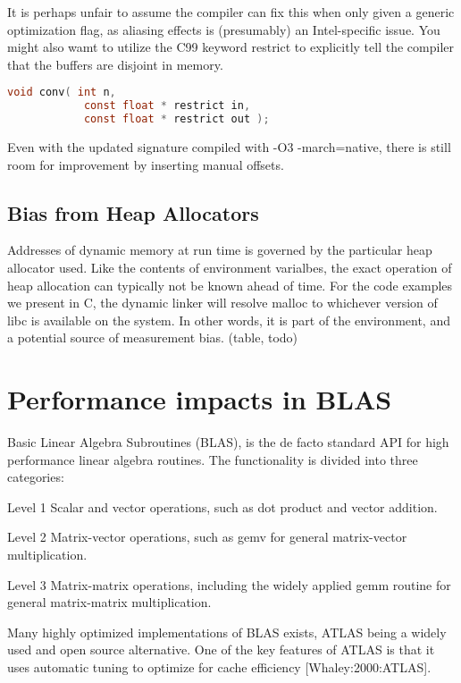 \documentclass[a4paper,10pt,twocolumn,twoside]{article}
\begin{document}
It is perhaps unfair to assume the compiler can fix this when only given a generic optimization flag, as aliasing effects is (presumably) an Intel-specific issue.
You might also wamt to utilize the C99 keyword restrict to explicitly tell the compiler that the buffers are disjoint in memory.

\begin{lstlisting}[language=C]
void conv( int n,
            const float * restrict in,
            const float * restrict out );
\end{lstlisting}

Even with the updated signature compiled with -O3 -march=native, there is still room for improvement by inserting manual offsets.


\subsection{Bias from Heap Allocators}
Addresses of dynamic memory at run time is governed by the particular heap allocator used.
Like the contents of environment varialbes, the exact operation of heap allocation can typically not be known ahead of time.
For the code examples we present in C, the dynamic linker will resolve malloc to whichever version of libc is available on the system.
In other words, it is part of the environment, and a potential source of measurement bias.
(table, todo)



\section{Performance impacts in BLAS}

Basic Linear Algebra Subroutines (BLAS), is the de facto standard API for high performance linear algebra routines.
The functionality is divided into three categories: 

\begin{description}
  \item{Level 1} Scalar and vector operations, such as dot product and vector addition.
  \item{Level 2} Matrix-vector operations, such as gemv for general matrix-vector multiplication.
  \item{Level 3} Matrix-matrix operations, including the widely applied gemm routine for general matrix-matrix multiplication. 
\end{description}

Many highly optimized implementations of BLAS exists, ATLAS being a widely used and open source alternative. One of the key features of ATLAS is that it uses automatic tuning to optimize for cache efficiency [Whaley:2000:ATLAS]. 
\end{document}
